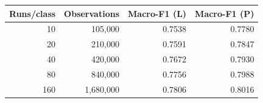 
\begin{tabular}{rrrr}
\toprule
Runs/class & Observations & Macro-F1 (L) & Macro-F1 (P)\\
\midrule
10 & 105,000 & 0.7538 & 0.7780\\
20 & 210,000 & 0.7591 & 0.7847\\
40 & 420,000 & 0.7672 & 0.7930\\
80 & 840,000 & 0.7756 & 0.7988\\
160 & 1,680,000 & 0.7806 & 0.8016\\
\bottomrule
\end{tabular}

